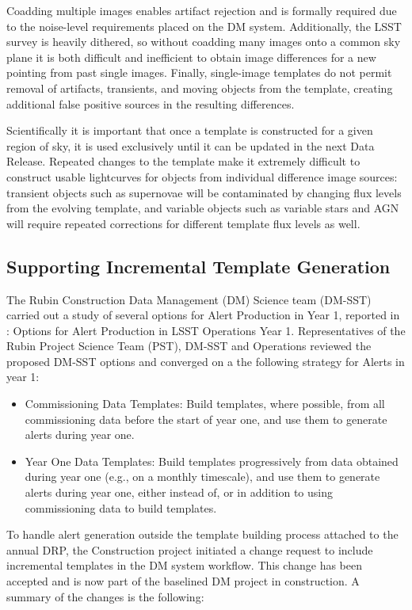 Coadding multiple images enables artifact rejection   and is formally required due to the noise-level requirements placed on the DM system. 
Additionally, the LSST survey is heavily dithered, so without coadding many images onto a common sky plane it is both difficult and inefficient to obtain image differences for a new pointing from past single images.
Finally, single-image templates do not permit removal of artifacts, transients, and moving objects from the template, creating additional false positive sources in the resulting differences.

Scientifically it is important that once a template is constructed for a given region of sky, it is used exclusively until it can be updated in the next Data Release.
Repeated changes to the template make it extremely difficult to construct usable lightcurves for objects from individual difference image sources: transient objects such as supernovae will be contaminated by changing flux levels from the evolving template, and variable objects such as variable stars and AGN will require repeated corrections for different template flux levels as well.

\subsection{Supporting Incremental Template Generation}

The Rubin Construction Data Management (DM) Science team (DM-SST) carried out a study of several options for Alert Production in Year 1, reported in  : Options for Alert Production in LSST Operations Year 1.
Representatives of the Rubin Project Science Team (PST), DM-SST and Operations reviewed the proposed DM-SST options  and converged on a the following  strategy for Alerts in year 1:

\begin{itemize}
\item Commissioning Data Templates: Build templates, where possible, from all commissioning data before the start of year one, and use them to generate alerts during year one.
\item Year One Data Templates: Build templates progressively from data obtained during year one (e.g., on a monthly timescale), and use them to generate alerts during year one, either instead of, or in addition to using commissioning data to build templates.
\end{itemize}

To handle alert generation outside the template building process attached to the annual DRP, the Construction project initiated a change request to include incremental templates in the DM system workflow. This change has been accepted and is now part of the baselined DM project in construction. A summary of the changes is the following:

